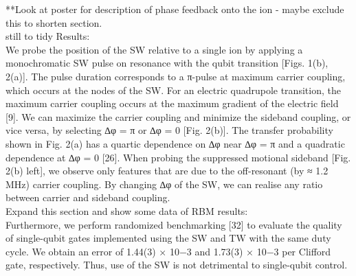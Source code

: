 \documentclass[12pt]{iopart}
\begin{document}

    **Look at poster for description of phase feedback onto the ion -
    maybe exclude this to shorten section.\\

    still to tidy Results: \\
    We probe the position of the SW relative to a single ion by applying a
    monochromatic SW pulse on resonance with the qubit transition
    [Figs. 1(b), 2(a)]. The pulse duration corresponds to a π-pulse at
    maximum carrier coupling, which occurs at the nodes of the SW. For an
    electric quadrupole transition, the maximum carrier coupling occurs at
    the maximum gradient of the electric field [9]. We can maximize the
    carrier coupling and minimize the sideband coupling, or vice versa, by
    selecting ∆φ = π or ∆φ = 0 [Fig. 2(b)]. The transfer probability shown
    in Fig. 2(a) has a quartic dependence on ∆φ near ∆φ = π and a
    quadratic dependence at ∆φ = 0 [26]. When probing the suppressed
    motional sideband [Fig. 2(b) left], we observe only features that are
    due to the off-resonant (by ≈ 1.2 MHz) carrier coupling. By changing
    ∆φ of the SW, we can realise any ratio between carrier and sideband
    coupling.\\



    Expand this section and show some data of RBM results:\\
    Furthermore, we perform randomized benchmarking [32] to evaluate
    the quality of single-qubit gates implemented using the SW and TW
    with the same duty cycle. We obtain an error of 1.44(3) × 10−3 and
    1.73(3) × 10−3 per Clifford gate, respectively. Thus, use of the
    SW is not detrimental to single-qubit control. \\
\end{document}

